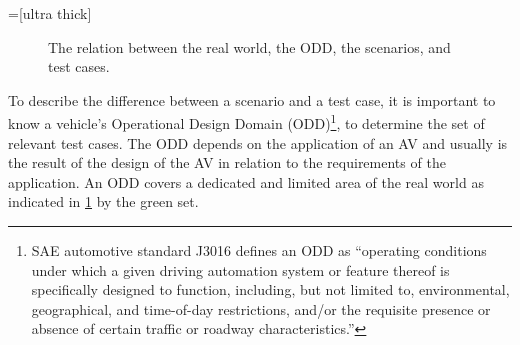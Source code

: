 \documentclass[twoside,twocolumn,9pt]{extarticle}
\newlength\realworldwidth
\newlength\realworldheight
\theoremstyle{plain}
\begin{document}
\setlength{\realworldwidth}{15em}
\setlength{\realworldheight}{9em}
=[ultra thick]
\begin{figure}[t]
	\centering
	\caption{The relation between the real world, the ODD, the scenarios, and test cases.
	}
	\label{fig:test cases}
\end{figure}

To describe the difference between a scenario and a test case, it is important to know a vehicle's Operational Design Domain (ODD)\footnote{SAE automotive standard J3016 \autocite{sae2018j3016} defines an ODD as ``operating conditions under which a given driving automation system or feature thereof is specifically designed to function, including, but not limited to, environmental, geographical, and time-of-day restrictions, and/or the requisite presence or absence of certain traffic or roadway characteristics.''}, to determine the set of relevant test cases. The ODD depends on the application of an AV and usually is the result of the design of the AV in relation to the requirements of the application. An ODD covers a dedicated and limited area of the real world as indicated in \cref{fig:test cases} by the green set.
\end{document}
